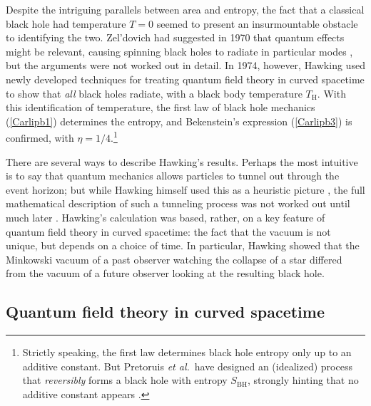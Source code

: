 \documentclass[12pt]{article}
\begin{document}
Despite the intriguing parallels between area and entropy, the fact
that a classical black hole had temperature $T=0$ seemed to present an 
insurmountable obstacle to identifying the two.  Zel'dovich had suggested 
in 1970 that quantum effects might be relevant, causing
spinning black holes to radiate in particular modes \cite{Zeldovich}, 
but the arguments were not worked out in detail.  In 1974, however, 
Hawking \cite{Hawking,Hawkingc} used newly developed techniques
 for treating quantum field  theory in curved spacetime \cite{Parker} 
to show that \emph{all} black holes radiate, with
a black body temperature $T_{\scriptscriptstyle\mathrm{H}}$.  With this
identification of temperature, the first law of black hole mechanics
(\ref{Carlipb1}) determines the entropy, and
Bekenstein's expression (\ref{Carlipb3}) is confirmed, with
$\eta=1/4$.\footnote{Strictly speaking, the first law determines 
black hole entropy only up to an additive constant. But Pretoruis
{\it et al.}\ have designed an (idealized) process that \emph{reversibly} 
forms a black hole with entropy $S_{\scriptscriptstyle\mathrm{BH}}$, 
strongly hinting that no additive constant appears \cite{Pretorius}.}

There are several ways to describe Hawking's results.  Perhaps the most
intuitive is to say that quantum mechanics allows particles to tunnel out
through the event horizon; but while Hawking himself used this as
a heuristic picture \cite{Hawkingc}, the full mathematical
description of such a tunneling process was not worked out until much 
later \cite{Parikh}.  Hawking's calculation was based, rather, on a key
feature of quantum field theory in curved spacetime: the fact that the vacuum
is not unique, but depends on a choice of time.  In particular, Hawking
showed that the Minkowski vacuum of a past observer watching the 
collapse of a star differed from the vacuum of a future observer looking
at the resulting black hole.

\subsection{Quantum field theory in curved spacetime}
\end{document}
